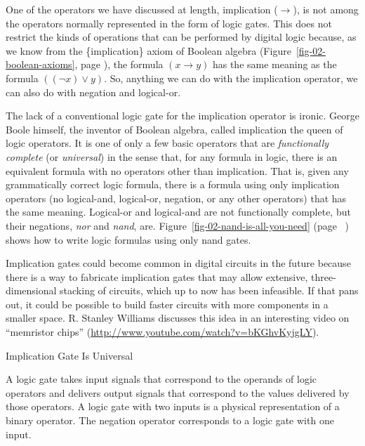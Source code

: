 \begin{aside}
One of the operators we have discussed at length, implication
($\rightarrow$), is not among the operators normally represented
in the form of logic gates. This does not restrict the kinds of
operations that can be performed by digital logic because,
as we know from the \{implication\} axiom of Boolean algebra
(Figure~\ref{fig-02-boolean-axioms}, page \pageref{fig-02-boolean-axioms}),
the formula $(x \rightarrow y)$ has the same meaning as the
formula $((\neg x) \vee y)$. So, anything we can do with
the implication operator, we can also do with
negation and logical-or.

The lack of a conventional logic gate for the implication operator
is ironic.
George Boole himself, the inventor of Boolean algebra,
called implication the queen of logic operators.
It is one of only a few basic operators that are
\emph{functionally complete} (or \emph{universal})
in the sense that, for any formula in logic, there is an equivalent formula
with no operators other than implication.
That is, given any grammatically correct logic formula,
there is a formula using only
implication operators (no logical-and, logical-or,
negation, or any other operators)
that has the same meaning.
Logical-or and logical-and are not functionally complete,
but their negations,
\emph{nor} and \emph{nand}, are.
Figure~\ref{fig-02-nand-is-all-you-need} (page ~\pageref{fig-02-nand-is-all-you-need})
shows how to write logic formulas using only nand gates.

Implication gates could
become common in digital circuits in the future
because there is a way to fabricate implication gates that may allow extensive,
three-dimensional stacking of circuits, which up to now has been infeasible.
If that pans out, it could be possible to build
faster circuits with more components in a smaller space.
R. Stanley Williams discusses this
idea in an interesting video on ``memristor chips''
(\url{http://www.youtube.com/watch?v=bKGhvKyjgLY}).
\caption{Implication Gate Is Universal}
\label{no-implication-gate}
\end{aside}

A logic gate takes input signals that correspond
to the operands of logic operators and delivers output signals
that correspond to the values delivered by those operators.
A logic gate with two inputs is a physical representation of
a binary operator. The negation operator corresponds to a
logic gate with one input.

